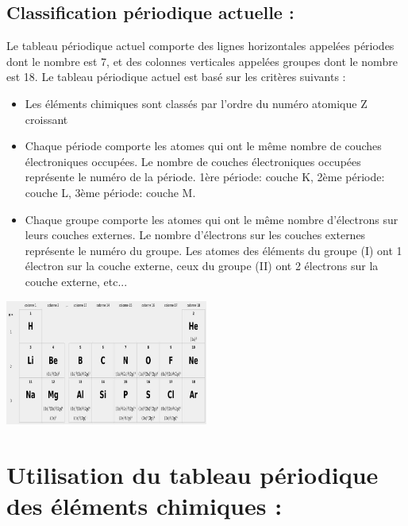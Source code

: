 \documentclass[12pt]{article}
\begin{document}
\subsection{Classification périodique actuelle : }
Le tableau périodique actuel comporte des lignes horizontales appelées périodes dont le
nombre est 7, et des colonnes verticales appelées groupes dont le nombre est 18. Le tableau
périodique actuel est basé sur les critères suivants :

\begin{itemize}
    \item Les éléments chimiques sont classés par l’ordre du numéro atomique Z croissant
    \item Chaque période comporte les atomes qui ont le même nombre de couches
électroniques occupées. Le nombre de couches électroniques occupées représente le 
numéro de la période. 1ère période: couche K, 2ème période: couche L, 3ème période: couche M.
\item Chaque groupe comporte les atomes qui ont le même nombre d’électrons sur leurs
couches externes. Le nombre d’électrons sur les couches externes représente le numéro
du groupe. Les atomes des éléments du groupe (I) ont 1 électron sur la couche externe,
ceux du groupe (II) ont 2 électrons sur la couche externe, etc...
\end{itemize}

\begin{center}
    \includegraphics[width=0.5\textwidth]{./img/img00.jpg}
\end{center}

\section{Utilisation du tableau périodique des éléments chimiques : }
\end{document}
